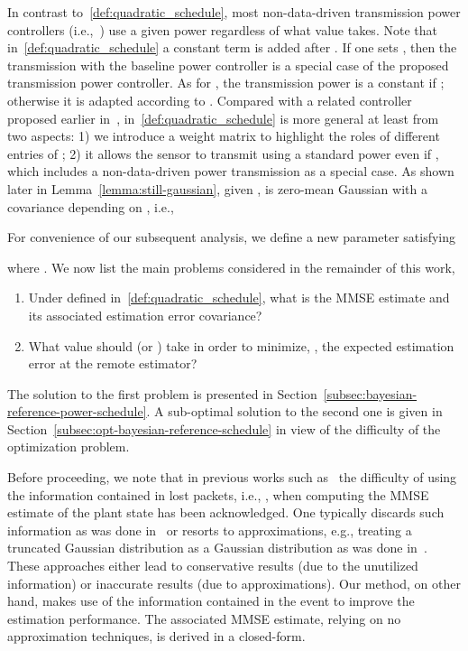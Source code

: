 \documentclass[twocolumn]{autart}    \usepackage{cite}
\begin{document}
{{In contrast to~\eqref{def:quadratic_schedule}, most non-data-driven transmission power controllers
(i.e.,~\cite{queahl10,leong2012power})
use a given power 
regardless of what value  takes.
Note that in~\eqref{def:quadratic_schedule} a constant term  is added
after .
If one sets , then the transmission
with the baseline power controller  is a special case of the proposed
transmission power controller.
As for ,
the transmission power is a constant  if ; otherwise it is adapted according to .
{Compared with a related controller proposed earlier
in~\cite{Liyuzhe13CDC},  in~\eqref{def:quadratic_schedule} is more general at least
from two aspects: 1) we introduce a weight matrix  to highlight
the roles of different entries of ; 2) it allows
the sensor to transmit using a standard power  even
if , which
includes a non-data-driven power transmission as a special case.}
As shown later in Lemma~\ref{lemma:still-gaussian}, given
,
 is zero-mean Gaussian with a
covariance  depending on , i.e.,

For convenience of our subsequent analysis, we define a new parameter  satisfying

where .
We now list the main
problems considered in the remainder of this work,
\begin{enumerate}
\item Under  defined in~\eqref{def:quadratic_schedule}, what is the
    MMSE estimate and its associated
    estimation error covariance?
\item What value should  (or ) take in order
to minimize, , the expected estimation error at the remote estimator?
\end{enumerate}
The solution to the first problem is presented in
Section~\ref{subsec:bayesian-reference-power-schedule}.
A sub-optimal solution to the second one is given
in Section~\ref{subsec:opt-bayesian-reference-schedule} in
view of the difficulty of the optimization problem.


{Before proceeding, we note that in previous works such as~\cite{GatsisACC13}
the difficulty of
using the information contained in lost packets, i.e., , when computing
the MMSE estimate of the plant state has been acknowledged. One typically discards such information as was done in~\cite{GatsisACC13} or resorts to approximations, e.g., treating a truncated Gaussian distribution as a Gaussian distribution as was done in~\cite{wu2013event}. These approaches either lead to conservative results (due to the unutilized information) or inaccurate results (due to approximations).
Our method, on other hand, makes use of the information contained in the event  to improve the estimation performance. The associated MMSE estimate, relying on no approximation techniques, is derived in a closed-form.}

}}
\end{document}
